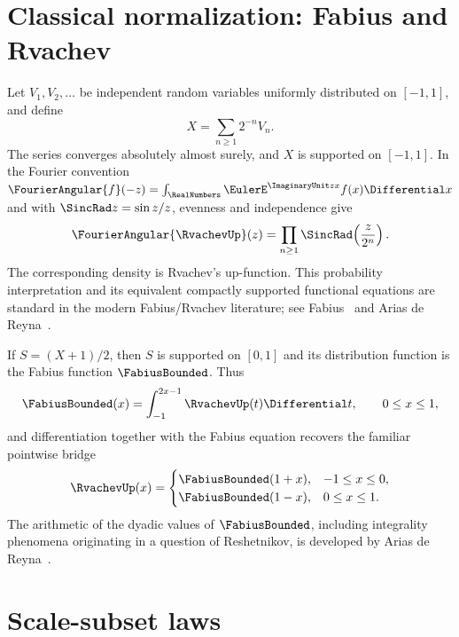 \documentclass[11pt,oneside]{article}
\numberwithin{equation}{section}
\theoremstyle{definition}
\theoremstyle{remark}
\begin{document}
\section{Classical normalization: Fabius and Rvachev}
\label{sec:normalization}

Let $V_1,V_2,\ldots$ be independent random variables uniformly distributed on $[-1,1]$,
and define
\begin{equation}
 X=\sum_{n\ge1}2^{-n}V_n.
 \label{eq:full-random-series}
\end{equation}
The series converges absolutely almost surely, and $X$ is supported on $[-1,1]$.  In the
Fourier convention
\(
 \FourierAngular{f}(-z)=\int_\RealNumbers \EulerE^{\ImaginaryUnit zx}f(x)\Differential x
\)
and with $\SincRad z=\sin z/z$, evenness and independence give
\begin{equation}
 \FourierAngular{\RvachevUp}(z)=\prod_{n\ge1}\SincRad\!\left(\frac z{2^n}\right).
 \label{eq:up-product}
\end{equation}
The corresponding density is Rvachev's up-function.  This probability interpretation and
its equivalent compactly supported functional equations are standard in the modern
Fabius/Rvachev literature; see Fabius~\cite{Fabius1966} and Arias de
Reyna~\cite{Arias1982,Arias2017Compact}.

If $S=(X+1)/2$, then $S$ is supported on $[0,1]$ and its distribution function is the
Fabius function $\FabiusBounded$.  Thus
\begin{equation}
 \FabiusBounded(x)=\int_{-1}^{2x-1}\RvachevUp(t)\Differential t,
 \qquad 0\le x\le1,
 \label{eq:F-up-cdf}
\end{equation}
and differentiation together with the Fabius equation recovers the familiar pointwise
bridge
\begin{equation}
 \RvachevUp(x)=
 \begin{cases}
 \FabiusBounded(1+x),&-1\le x\le0,\\
 \FabiusBounded(1-x),&0\le x\le1.
 \end{cases}
 \label{eq:F-up-pointwise}
\end{equation}
The arithmetic of the dyadic values of $\FabiusBounded$, including integrality phenomena originating
in a question of Reshetnikov, is developed by Arias de Reyna~\cite{AriasArithmetic}.

\section{Scale-subset laws}
\label{sec:scale-subsets}
\end{document}
